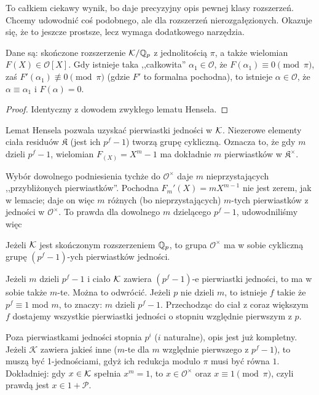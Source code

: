 To całkiem ciekawy wynik, bo daje precyzyjny opis pewnej klasy rozszerzeń.
Chcemy udowodnić coś podobnego, ale dla rozszerzeń nierozgałęzionych.
Okazuje się, że to jeszcze prostsze, lecz wymaga dodatkowego narzędzia.

\begin{twierdzenie}
	Dane są: skończone rozszerzenie $\mathcal K/\mathbb Q_p$ z jednolitością $\pi$, a także wielomian $F(X) \in \mathcal O[X]$.
	Gdy istnieje taka ,,całkowita'' $\alpha_1 \in \mathcal O$, że $F(\alpha_1) \equiv 0 \pmod \pi$, zaś $F'(\alpha_1) \not\equiv 0 \pmod \pi$ (gdzie $F'$ to formalna pochodna), to istnieje $\alpha \in \mathcal O$, że $\alpha \equiv \alpha_1$ i $F(\alpha) = 0$.
\end{twierdzenie}

\begin{proof}
	Identyczny z dowodem zwykłego lematu Hensela.
\end{proof}

Lemat Hensela pozwala uzyskać pierwiastki jedności w $\mathcal K$.
Niezerowe elementy ciała residuów $\mathfrak K$ (jest ich $p^f -1$) tworzą grupę cykliczną.
Oznacza to, że gdy $m$ dzieli $p^f-1$, wielomian $F_(X) = X^m-1$ ma dokładnie $m$ pierwiastków w $\mathfrak K^\times$.

Wybór dowolnego podniesienia tychże do $\mathcal O^\times$ daje $m$ nieprzystających ,,przybliżonych pierwiastków''.
Pochodna $F_m'(X) = mX^{m-1}$ nie jest zerem, jak w lemacie; daje on więc $m$ różnych (bo nieprzystających) $m$-tych pierwiastków z jedności w $\mathcal O^\times$.
To prawda dla dowolnego $m$ dzielącego $p^f-1$, udowodniliśmy więc

\begin{fakt} \label{vergisst}
	Jeżeli $\mathcal K$ jest skończonym rozszerzeniem $\mathbb Q_p$, to grupa $\mathcal O^\times$ ma w sobie cykliczną grupę $(p^f-1)$-ych pierwiastków jedności.
\end{fakt}

Jeżeli $m$ dzieli $p^f-1$ i ciało $\mathcal K$ zawiera $(p^f-1)$-e pierwiastki jedności, to ma w sobie także $m$-te.
Można to odwrócić.
Jeżeli $p$ nie dzieli $m$, to istnieje $f$ takie że $p^f \equiv 1$ mod $m$, to znaczy: $m$ dzieli $p^f-1$.
Przechodząc do ciał z coraz większym $f$ dostajemy wszystkie pierwiastki jedności o stopniu względnie pierwszym z $p$.

Poza pierwiastkami jedności stopnia $p^i$ ($i$ naturalne), opis jest już kompletny.
Jeżeli $\mathcal K$ zawiera jakieś inne ($m$-te dla $m$ względnie pierwszego z $p^f-1$), to muszą być 1-jednościami, gdyż ich redukcja modulo $\pi$ musi być równa $1$.
Dokładniej: gdy $x \in \mathcal K$ spełnia $x^m = 1$, to $x \in \mathcal O^\times$ oraz $x \equiv 1 \pmod \pi$, czyli prawdą jest $x \in 1 + \mathcal P$.

